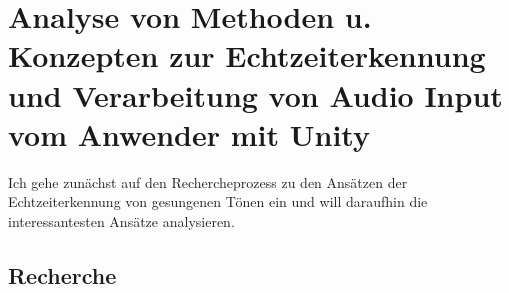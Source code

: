 \section{Analyse von Methoden u. Konzepten zur Echtzeiterkennung und Verarbeitung von Audio Input vom Anwender mit Unity}
Ich gehe zunächst auf den Rechercheprozess zu den Ansätzen der Echtzeiterkennung von gesungenen Tönen ein und will daraufhin die interessantesten Ansätze analysieren. 

\subsection{Recherche}

